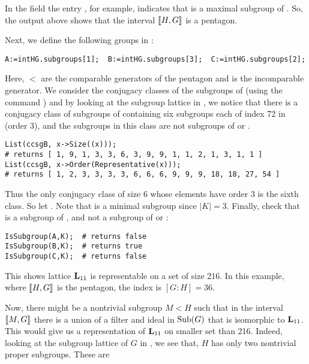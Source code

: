 \noindent 
In the  field the entry \code{[ 1, 3 ]}, for example,
indicates that  is a maximal subgroup of 
.
So, the \gap output above shows that the interval 
$\llbracket H, G \rrbracket$ is a pentagon.

Next, we define the following groups in \gap:

{\small 
\begin{verbatim}
A:=intHG.subgroups[1];  B:=intHG.subgroups[3];  C:=intHG.subgroups[2];
\end{verbatim}
}
Here,  $<$  are the comparable generators of the pentagon
and  is the incomparable generator.
We consider the conjugacy classes of the subgroups of 
(using the \gap command )
and by looking at the subgroup lattice in \xgap, we notice that 
there is a conjugacy class of subgroups of  containing six
subgroups each of index 72 in  (order 3), and the subgroups
in this class are not subgroups of  or .

{\small 
\begin{verbatim}
List(ccsgB, x->Size((x)));
# returns [ 1, 9, 1, 3, 3, 6, 3, 9, 9, 1, 1, 2, 1, 3, 1, 1 ]
List(ccsgB, x->Order(Representative(x)));
# returns [ 1, 2, 3, 3, 3, 3, 6, 6, 6, 9, 9, 9, 18, 18, 27, 54 ]
\end{verbatim}
}
Thus the only conjugacy class of size 6 whose elements 
have order 3 is the sixth class.  So let
.
Note that  is a minimal subgroup since $|K|=3$.  Finally,
check that  is a subgroup of , and not a subgroup of
 or :
{\small 
\begin{verbatim}
IsSubgroup(A,K);  # returns false
IsSubgroup(B,K);  # returns true
IsSubgroup(C,K);  # returns false
\end{verbatim}
}
This shows lattice $\mathbf{L}_{11}$ is representable on a set of size 216.
In this example, where $\llbracket H,G \rrbracket$ is the pentagon, the index is $[G:H]=36$.  

Now, there might be a nontrivial subgroup $M < H$ such that in the interval
$\llbracket M, G \rrbracket$ there is a union of a filter and ideal in $\operatorname{Sub}(G)$ that is isomorphic to
$\mathbf{L}_{11}$. This would give us a representation of $\mathbf{L}_{11}$ on smaller set than 216.
Indeed, looking at the subgroup lattice of $G$ in \xgap, we see that, 
$H$ has only two nontrivial proper subgroups.  These are

